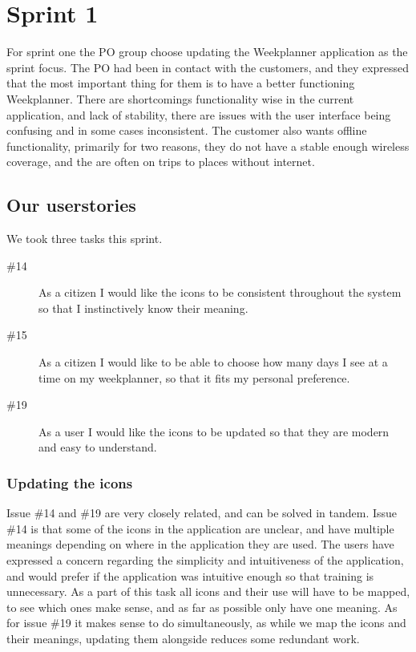 \chapter{Sprint 1}

For sprint one the \gls{PO} group choose updating the Weekplanner application as the sprint focus. 
The \gls{PO} had been in contact with the customers, and they expressed that the most important thing for them is to have a better functioning Weekplanner.
There are shortcomings functionality wise  in the current application, and lack of stability, there are issues with the user interface being confusing and in some cases inconsistent. The customer also wants offline functionality, primarily for two reasons, they do not have a stable enough wireless coverage, and the are often on trips to places without internet.

\section{Our userstories}
We took three tasks this sprint.
\begin{description}
    \item [\#14] As a citizen I would like the icons to be consistent throughout the system so that I instinctively know their meaning.
    \item [\#15] As a citizen I would like to be able to choose how many days I see at a time on my weekplanner, so that it fits my personal preference.
    \item [\#19] As a user I would like the icons to be updated so that they are modern and easy to understand.
\end{description}

\subsection{Updating the icons}
Issue \#14 and \#19 are very closely related, and can be solved in tandem. Issue \#14 is that some of the icons in the application are unclear, and have multiple meanings depending on where in the application they are used. The users have expressed a concern regarding the simplicity and intuitiveness of the application, and would prefer if the application was intuitive enough so that training is unnecessary.
As a part of this task all icons and their use will have to be mapped, to see which ones make sense, and as far as possible only have one meaning. As for issue \#19 it makes sense to do simultaneously, as while we map the icons and their meanings, updating them alongside reduces some redundant work. 

